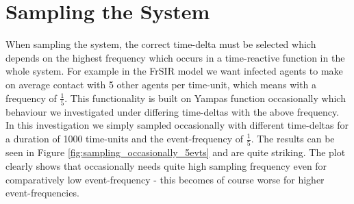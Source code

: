 \section{Sampling the System}
When sampling the system, the correct time-delta must be selected which depends on the highest frequency which occurs in a time-reactive function in the whole system. For example in the FrSIR model we want infected agents to make on average contact with 5 other agents per time-unit, which means with a frequency of $\frac{1}{5}$. This functionality is built on Yampas function occasionally which behaviour we investigated under differing time-deltas with the above frequency. In this investigation we simply sampled occasionally with different time-deltas for a duration of 1000 time-units and the event-frequency of $\frac{1}{5}$. The results can be seen in Figure \ref{fig:sampling_occasionally_5evts} and are quite striking. The plot clearly shows that occasionally needs quite high sampling frequency even for comparatively low event-frequency - this becomes of course worse for higher event-frequencies.


